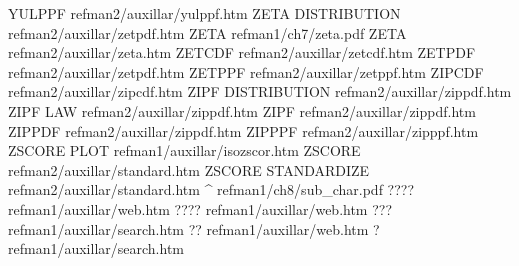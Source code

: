 YULPPF                                  refman2/auxillar/yulppf.htm
ZETA DISTRIBUTION                       refman2/auxillar/zetpdf.htm
ZETA                                    refman1/ch7/zeta.pdf
ZETA                                    refman2/auxillar/zeta.htm
ZETCDF                                  refman2/auxillar/zetcdf.htm
ZETPDF                                  refman2/auxillar/zetpdf.htm
ZETPPF                                  refman2/auxillar/zetppf.htm
ZIPCDF                                  refman2/auxillar/zipcdf.htm
ZIPF DISTRIBUTION                       refman2/auxillar/zippdf.htm
ZIPF LAW                                refman2/auxillar/zippdf.htm
ZIPF                                    refman2/auxillar/zippdf.htm
ZIPPDF                                  refman2/auxillar/zippdf.htm
ZIPPPF                                  refman2/auxillar/zipppf.htm
ZSCORE PLOT                             refman1/auxillar/isozscor.htm
ZSCORE                                  refman2/auxillar/standard.htm
ZSCORE STANDARDIZE                      refman2/auxillar/standard.htm
^                                       refman1/ch8/sub_char.pdf
????                                    refman1/auxillar/web.htm
????                                    refman1/auxillar/web.htm
???                                     refman1/auxillar/search.htm
??                                      refman1/auxillar/web.htm
?                                       refman1/auxillar/search.htm
